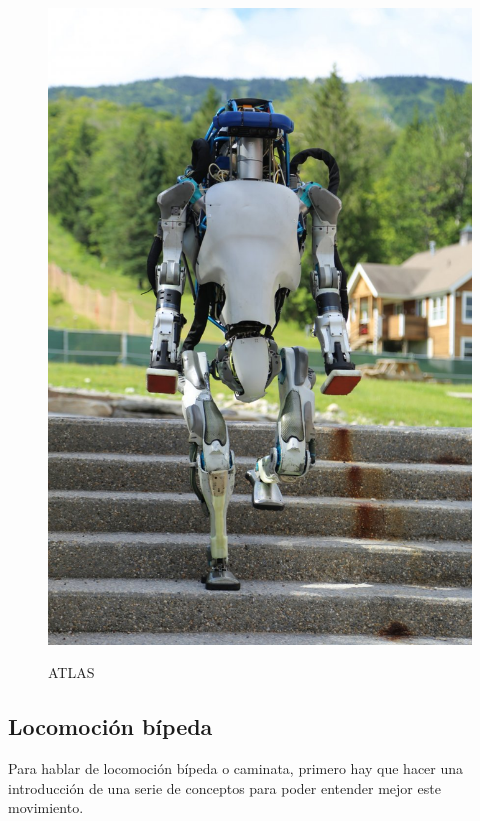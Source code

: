 \begin{figure}[H]
\centering
{\includegraphics[scale=0.2]{imagenes/apartado_2/214_atlas_boston_dynamics}}
\caption{ATLAS}
\label{figura214}
\end{figure}

\newpage

\subsection{Locomoción bípeda}

Para hablar de locomoción bípeda o caminata, primero hay que hacer una introducción de una serie de conceptos para poder entender mejor este movimiento.

